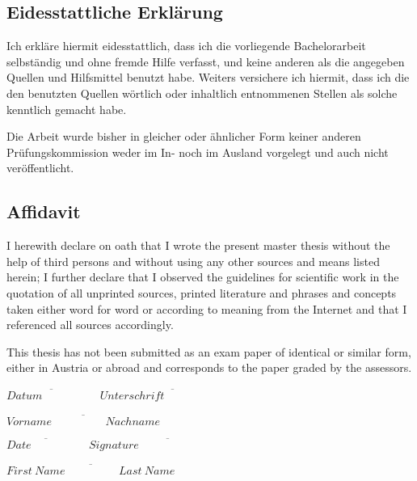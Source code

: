 
\ifmmtlanguagegerman
\subsection*{Eidesstattliche Erklärung}


Ich erkläre hiermit eidesstattlich, dass  ich  die vorliegende Bachelorarbeit selbständig  und ohne fremde Hilfe verfasst, und keine  anderen  als die angegeben Quellen und  Hilfsmittel benutzt  habe. Weiters versichere ich hiermit, dass ich   die den benutzten Quellen  wörtlich oder inhaltlich entnommenen Stellen als solche kenntlich gemacht habe.

Die Arbeit wurde bisher in gleicher oder ähnlicher Form keiner anderen Prüfungskommission weder im In- noch im Ausland vorgelegt und auch nicht veröffentlicht.

\else

\subsection*{Affidavit}

I herewith declare on oath that I wrote the present master thesis without the help of third persons and without using any other sources and means listed herein; I further declare that I observed the guidelines for scientific work in the quotation of all unprinted sources, printed literature and phrases and concepts taken either word for word or according to meaning from the Internet and that I referenced all sources accordingly.

This thesis has not been submitted as an exam paper of identical or similar form, either in Austria or abroad and corresponds to the paper graded by the assessors.

\fi

\vspace*{3cm}



\hfill

\ifmmtlanguagegerman
$\overline{Datum \hspace{2cm}}$ \hfill $\overline{{Unterschrift}\hspace{3cm}}$

\vspace*{1cm}

\hfill $\overline{{Vorname\hspace{2cm}Nachname}}$
 
 \else
 $\overline{Date \hspace{2cm}}$ \hfill $\overline{{Signature}\hspace{4cm}}$

\vspace*{1cm}

 \hfill $\overline{{First~Name\hspace{2cm}Last~Name}}$
 \fi

